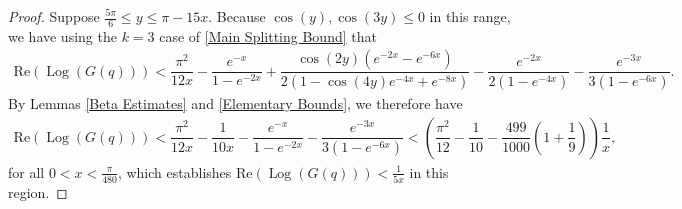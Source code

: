 \documentclass[11pt,reqno]{amsart}
\theoremstyle{definition}
\theoremstyle{plain}
\theoremstyle{named}
\DeclareMathOperator\Log{Log}
\numberwithin{equation}{section}
\theoremstyle{example}
\def\lp{\left(}
\def\rp{\right)}
\begin{document}
\begin{proof}
Suppose $\frac{5\pi}{6} \leq y \leq \pi - 15x$. Because $\cos\lp y \rp, \cos\lp 3y \rp \leq 0$ in this range, we have using the $k = 3$ case of \eqref{Main Splitting Bound} that
\begin{align*}
    \mathrm{Re}\lp \Log\lp G(q) \rp \rp < \dfrac{\pi^2}{12x} - \dfrac{e^{-x}}{1 - e^{-2x}} + \dfrac{\cos\lp 2y \rp \lp e^{-2x} - e^{-6x} \rp}{2\lp 1 - \cos\lp 4y \rp e^{-4x} + e^{-8x} \rp} - \dfrac{e^{-2x}}{2\lp 1 - e^{-4x} \rp} - \dfrac{e^{-3x}}{3\lp 1 - e^{-6x} \rp}.
\end{align*}
By Lemmas \ref{Beta Estimates} and \ref{Elementary Bounds}, we therefore have
\begin{align*}
    \mathrm{Re}\lp \Log\lp G(q) \rp \rp < \dfrac{\pi^2}{12x} - \dfrac{1}{10x} - \dfrac{e^{-x}}{1 - e^{-2x}} - \dfrac{e^{-3x}}{3\lp 1 - e^{-6x} \rp} < \lp \dfrac{\pi^2}{12} - \dfrac{1}{10} - \dfrac{499}{1000} \lp 1 + \dfrac{1}{9} \rp \rp \dfrac{1}{x},
\end{align*}
for all $0 < x < \frac{\pi}{480}$, which establishes $\mathrm{Re}\lp \Log\lp G(q) \rp \rp < \frac{1}{5x}$ in this region.


\end{proof}
\end{document}
